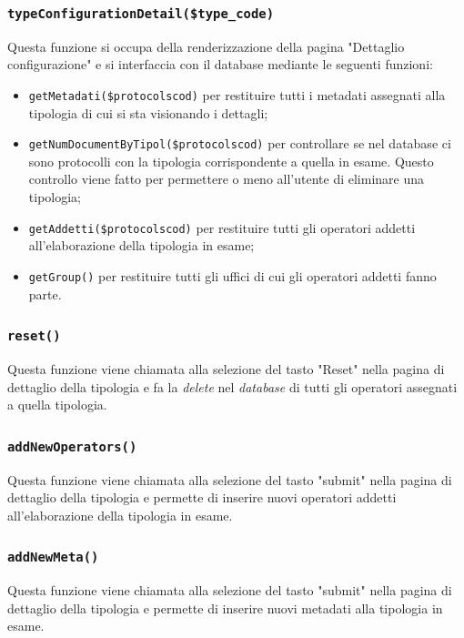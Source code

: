     \subsubsection{\texttt{typeConfigurationDetail(\$type\_code)}}
    Questa funzione si occupa della renderizzazione della pagina "Dettaglio configurazione" e si interfaccia con il database mediante le seguenti funzioni:
    \begin{itemize}
        \item \texttt{getMetadati(\$protocolscod)} per restituire tutti i metadati assegnati alla tipologia di cui si sta visionando i dettagli;
        
        \item \texttt{getNumDocumentByTipol(\$protocolscod)} per controllare se nel database ci sono protocolli con la tipologia corrispondente a quella in esame. Questo controllo viene fatto per permettere o meno all'utente di eliminare una tipologia;
        
        \item \texttt{getAddetti(\$protocolscod)} per restituire tutti gli operatori addetti all'elaborazione della tipologia in esame;
        
        \item \texttt{getGroup()} per restituire tutti gli uffici di cui gli operatori addetti fanno parte. 
    \end{itemize}
    
    \subsubsection{\texttt{reset()}}
    Questa funzione viene chiamata alla selezione del tasto "Reset" nella pagina di dettaglio della tipologia e fa la \textit{delete} nel \textit{database} di tutti gli operatori assegnati a quella tipologia.
    
    \subsubsection{\texttt{addNewOperators()}}
    Questa funzione viene chiamata alla selezione del tasto "submit" nella pagina di dettaglio della tipologia e permette di inserire nuovi operatori addetti all'elaborazione della tipologia in esame.
    
    \subsubsection{\texttt{addNewMeta()}}
    Questa funzione viene chiamata alla selezione del tasto "submit" nella pagina di dettaglio della tipologia e permette di inserire nuovi metadati alla tipologia in esame.
    
